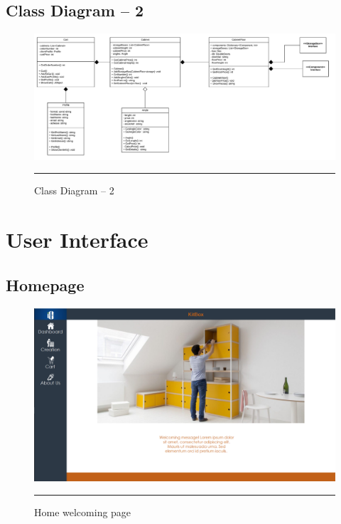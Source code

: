     \newpage
    \subsection{Class Diagram – 2}
        \vfill
        \begin{figure}[h!]
            \centering
			\includegraphics[width = 1.3\textwidth,angle = 90]{Figures/ClassDiagram-2.png}
			\rule{35em}{0.5pt}
			\caption{Class Diagram – 2}
			\label{classdiagram2}
    	\end{figure}
        \vfill

\newpage
\section{User Interface}
\label{Userinterface}
    \subsection{Homepage}
        \vfill
        \begin{figure}[h!]
            \centering
    		\includegraphics[width =1.2\textwidth,angle = 90]{Figures/Homepage.PNG}
    		\rule{35em}{0.5pt}
    		\caption{Home welcoming page}
    		\label{homepage}
    	\end{figure}
    	\vfill
    	
